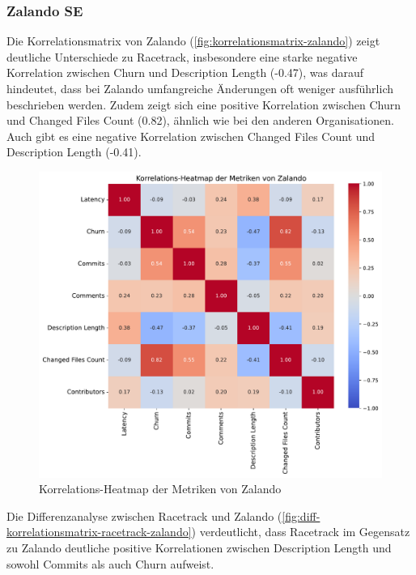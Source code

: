 \subsubsection{Zalando SE}
Die Korrelationsmatrix von Zalando (\autoref{fig:korrelationsmatrix-zalando}) zeigt deutliche Unterschiede zu Racetrack, insbesondere eine starke negative Korrelation zwischen Churn und Description Length (-0.47), was darauf hindeutet, dass bei Zalando umfangreiche Änderungen oft weniger ausführlich beschrieben werden. Zudem zeigt sich eine positive Korrelation zwischen Churn und Changed Files Count (0.82), ähnlich wie bei den anderen Organisationen. Auch gibt es eine negative Korrelation zwischen Changed Files Count und Description Length (-0.41).

\begin{figure}[htbp]
    \includegraphics[width=\textwidth]{Figures/zalando-korrelationsmatrix.pdf}
    \caption{Korrelations-Heatmap der Metriken von Zalando}
    \label{fig:korrelationsmatrix-zalando}
\end{figure}

Die Differenzanalyse zwischen Racetrack und Zalando (\autoref{fig:diff-korrelationsmatrix-racetrack-zalando}) verdeutlicht, dass Racetrack im Gegensatz zu Zalando deutliche positive Korrelationen zwischen Description Length und sowohl Commits als auch Churn aufweist.

